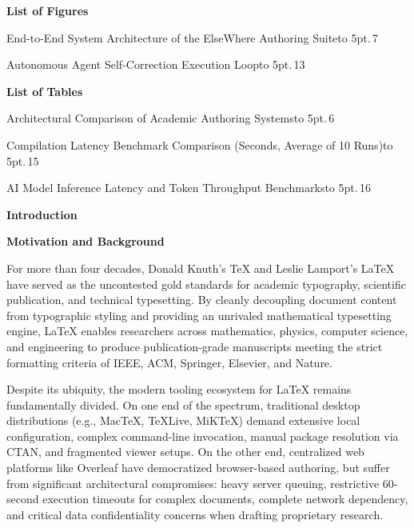 \documentclass[12pt,a4paper,twoside]{article}
\newcommand{\emptypara}{\mbox{}\par}
\newcommand{\hone}[1]{%
  \begingroup\setlength{\parskip}{0pt}%
  {\fontsize{18pt}{21.6pt}\selectfont\bfseries #1}\par\nopagebreak
  \vspace{6pt}
  \endgroup}
\newcommand{\numhead}[3]{%
  \begingroup\setlength{\parskip}{0pt}%
  \noindent\hspace*{0.25in}\makebox[0.25in][l]{\fontsize{18pt}{21.6pt}\selectfont\bfseries #1.}%
  {\fontsize{18pt}{21.6pt}\selectfont\bfseries #2}{\fontsize{18pt}{21.6pt}\selectfont #3}\par\nopagebreak
  \vspace{6pt}
  \endgroup}
\newcommand{\subhead}[2]{%
  \begingroup\setlength{\parskip}{0pt}\vspace{10pt}%
  \noindent\hspace*{0.25in}\makebox[0.35in][l]{\fontsize{13pt}{15.6pt}\selectfont\bfseries #1}%
  {\fontsize{13pt}{15.6pt}\selectfont\bfseries #2}\par\nopagebreak
  \vspace{4pt}
  \endgroup}
\newcommand{\tocdots}{\leaders\hbox to 5pt{\hss.\hss}\hfill}
\newcommand{\tocrow}[2]{\noindent #1\tocdots\,#2\par}
\begin{document}
\newpage
\hone{List of Figures}
{\raggedright\setlength{\parskip}{5pt}
\tocrow{End-to-End System Architecture of the ElseWhere Authoring Suite}{7}
\tocrow{Autonomous Agent Self-Correction Execution Loop}{13}
}

\emptypara\vspace{14pt}
\hone{List of Tables}
{\raggedright\setlength{\parskip}{5pt}
\tocrow{Architectural Comparison of Academic Authoring Systems}{6}
\tocrow{Compilation Latency Benchmark Comparison (Seconds, Average of 10 Runs)}{15}
\tocrow{AI Model Inference Latency and Token Throughput Benchmarks}{16}
}

\newpage
\pagestyle{mainmatter}
\setcounter{page}{1}

\numhead{1}{Introduction}{}

\subhead{1.1}{Motivation and Background}
For more than four decades, Donald Knuth's \TeX{} and Leslie Lamport's \LaTeX{} have served as the uncontested gold standards for academic typography, scientific publication, and technical typesetting. By cleanly decoupling document content from typographic styling and providing an unrivaled mathematical typesetting engine, \LaTeX{} enables researchers across mathematics, physics, computer science, and engineering to produce publication-grade manuscripts meeting the strict formatting criteria of IEEE, ACM, Springer, Elsevier, and Nature.

Despite its ubiquity, the modern tooling ecosystem for \LaTeX{} remains fundamentally divided. On one end of the spectrum, traditional desktop distributions (e.g., Mac\TeX{}, \TeX{}Live, MiK\TeX{}) demand extensive local configuration, complex command-line invocation, manual package resolution via CTAN, and fragmented viewer setups. On the other end, centralized web platforms like Overleaf have democratized browser-based authoring, but suffer from significant architectural compromises: heavy server queuing, restrictive 60-second execution timeouts for complex documents, complete network dependency, and critical data confidentiality concerns when drafting proprietary research.
\end{document}
